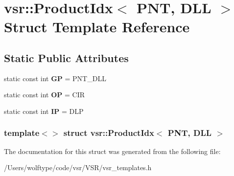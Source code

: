 \hypertarget{structvsr_1_1_product_idx_3_01_p_n_t_00_01_d_l_l_01_4}{\section{vsr\-:\-:Product\-Idx$<$ P\-N\-T, D\-L\-L $>$ Struct Template Reference}
\label{structvsr_1_1_product_idx_3_01_p_n_t_00_01_d_l_l_01_4}
}
\subsection*{Static Public Attributes}
\begin{DoxyCompactItemize}
\item 
\hypertarget{structvsr_1_1_product_idx_3_01_p_n_t_00_01_d_l_l_01_4_a82cbcb3f998b3f21fdc7b3ed65ec0324}{static const int {\bfseries G\-P} = P\-N\-T\-\_\-\-D\-L\-L}\label{structvsr_1_1_product_idx_3_01_p_n_t_00_01_d_l_l_01_4_a82cbcb3f998b3f21fdc7b3ed65ec0324}

\item 
\hypertarget{structvsr_1_1_product_idx_3_01_p_n_t_00_01_d_l_l_01_4_acaa342b503f24f7c8680317f0b94eea6}{static const int {\bfseries O\-P} = C\-I\-R}\label{structvsr_1_1_product_idx_3_01_p_n_t_00_01_d_l_l_01_4_acaa342b503f24f7c8680317f0b94eea6}

\item 
\hypertarget{structvsr_1_1_product_idx_3_01_p_n_t_00_01_d_l_l_01_4_a5fcdbcc8707e45a757f4f92e63828b0e}{static const int {\bfseries I\-P} = D\-L\-P}\label{structvsr_1_1_product_idx_3_01_p_n_t_00_01_d_l_l_01_4_a5fcdbcc8707e45a757f4f92e63828b0e}

\end{DoxyCompactItemize}
\subsubsection*{template$<$$>$ struct vsr\-::\-Product\-Idx$<$ P\-N\-T, D\-L\-L $>$}



The documentation for this struct was generated from the following file\-:\begin{DoxyCompactItemize}
\item 
/\-Users/wolftype/code/vsr/\-V\-S\-R/vsr\-\_\-templates.\-h\end{DoxyCompactItemize}

